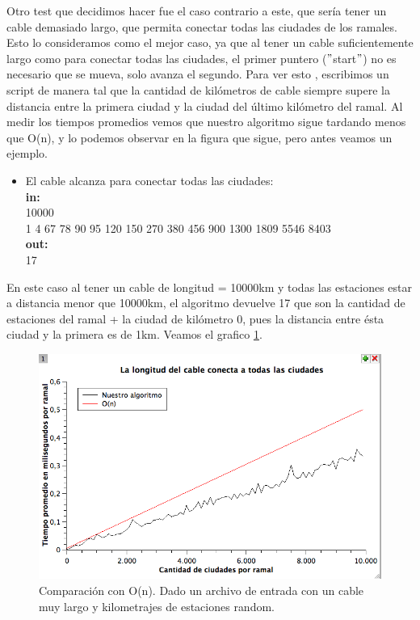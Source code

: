 Otro test que decidimos hacer fue el caso contrario a este, que sería tener un cable demasiado largo, que permita conectar todas las ciudades de los ramales. Esto lo consideramos como el mejor caso, ya que al tener un cable suficientemente largo como para conectar todas las ciudades, el primer puntero ($"$start$"$) no es necesario que se mueva, solo avanza el segundo. Para ver esto , escribimos un script de manera tal que la cantidad de kilómetros de cable siempre supere la distancia entre la primera ciudad y la ciudad del último kilómetro del ramal. Al medir los tiempos promedios vemos que nuestro algoritmo sigue tardando menos que O(n), y lo podemos observar en la figura que sigue, pero antes veamos un ejemplo. \\

\begin{itemize}
\item El cable alcanza para conectar todas las ciudades:\\
\textbf{in:}\\
10000\\
1 4 67 78 90 95 120 150 270 380 456 900 1300 1809 5546 8403\\
\textbf{out:}\\
17\\
\end{itemize}
En este caso al tener un cable de longitud = 10000km y todas las estaciones estar a distancia menor que 10000km, el algoritmo devuelve 17 que son la cantidad de estaciones del ramal + la ciudad de kilómetro 0, pues la distancia entre ésta ciudad y la primera es de 1km. Veamos el grafico \ref{ej1-tiempo-vs-cant-ciudades-random-long-cable-largo}. \\

\begin{figure}[H]
\begin{center}

  \includegraphics[width=\linewidth]{../graficos/ej1/CableLargo.png}
  \caption{{\small Comparación con O(n). Dado un archivo de entrada con un cable muy largo y kilometrajes de estaciones random.}} \label{ej1-tiempo-vs-cant-ciudades-random-long-cable-largo}
\endminipage

\end{center}
\end{figure}

